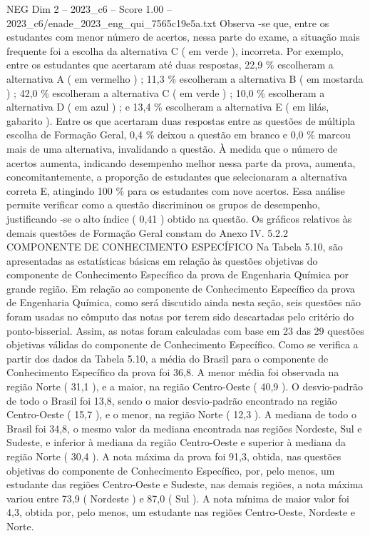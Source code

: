 \begin{textsample}{NEG Dim 2 – 2023\_c6 – Score 1.00 – 2023\_c6/enade\_2023\_eng\_qui\_7565c19e5a.txt}
Observa -se que, entre os estudantes com menor número de acertos, nessa parte do exame, a situação mais frequente foi a escolha da alternativa C ( em verde ), incorreta.
Por exemplo, entre os estudantes que acertaram até duas respostas, 22,9 \% escolheram a alternativa A ( em vermelho ) ; 11,3 \% escolheram a alternativa B ( em mostarda ) ; 42,0 \% escolheram a alternativa C ( em verde ) ; 10,0 \% escolheram a alternativa D ( em azul ) ; e 13,4 \% escolheram a alternativa E ( em lilás, gabarito ).
Entre os que acertaram duas respostas entre as questões de múltipla escolha de Formação Geral, 0,4 \% deixou a questão em branco e 0,0 \% marcou mais de uma alternativa, invalidando a questão.
À medida que o número de acertos aumenta, indicando desempenho melhor nessa parte da prova, aumenta, concomitantemente, a proporção de estudantes que selecionaram a alternativa correta E, atingindo 100 \% para os estudantes com nove acertos.
Essa análise permite verificar como a questão discriminou os grupos de desempenho, justificando -se o alto índice ( 0,41 ) obtido na questão.
Os gráficos relativos às demais questões de Formação Geral constam do Anexo IV. 5.2.2 COMPONENTE DE CONHECIMENTO ESPECÍFICO Na Tabela 5.10, são apresentadas as estatísticas básicas em relação às questões objetivas do componente de Conhecimento Específico da prova de Engenharia Química por grande região.
Em relação ao componente de Conhecimento Específico da prova de Engenharia Química, como será discutido ainda nesta seção, seis questões não foram usadas no cômputo das notas por terem sido descartadas pelo critério do ponto-bisserial.
Assim, as notas foram calculadas com base em 23 das 29 questões objetivas válidas do componente de Conhecimento Específico.
Como se verifica a partir dos dados da Tabela 5.10, a média do Brasil para o componente de Conhecimento Específico da prova foi 36,8.
A menor média foi observada na região Norte ( 31,1 ), e a maior, na região Centro-Oeste ( 40,9 ).
O desvio-padrão de todo o Brasil foi 13,8, sendo o maior desvio-padrão encontrado na região Centro-Oeste ( 15,7 ), e o menor, na região Norte ( 12,3 ).
A mediana de todo o Brasil foi 34,8, o mesmo valor da mediana encontrada nas regiões Nordeste, Sul e Sudeste, e inferior à mediana da região Centro-Oeste e superior à mediana da região Norte ( 30,4 ).
A nota máxima da prova foi 91,3, obtida, nas questões objetivas do componente de Conhecimento Específico, por, pelo menos, um estudante das regiões Centro-Oeste e Sudeste, nas demais regiões, a nota máxima variou entre 73,9 ( Nordeste ) e 87,0 ( Sul ).
A nota mínima de maior valor foi 4,3, obtida por, pelo menos, um estudante nas regiões Centro-Oeste, Nordeste e Norte.

\end{textsample}
